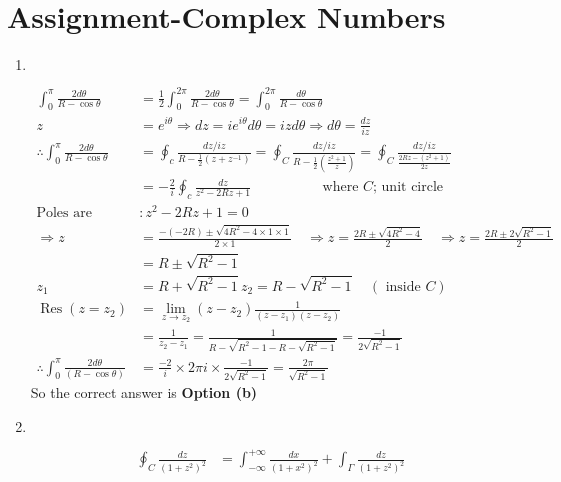 \chapter{Assignment-Complex Numbers}
\begin{enumerate}
	\item $\left. \right. $
	\begin{answer}
		\begin{align*}
		\int_{0}^{\pi} \frac{2 d \theta}{R-\cos \theta}&=\frac{1}{2} \int_{0}^{2 \pi} \frac{2 d \theta}{R-\cos \theta}=\int_{0}^{2 \pi} \frac{d \theta}{R-\cos \theta}\\
		z&=e^{i \theta} \Rightarrow d z=i e^{i \theta} d \theta=i z d \theta \Rightarrow d \theta=\frac{d z}{i z} \\
		\therefore \int_{0}^{\pi} \frac{2 d \theta}{R-\cos \theta}&=\oint_{c} \frac{d z / i z}{R-\frac{1}{2}\left(z+z^{-1}\right)}=\oint_{C} \frac{d z / i z}{R-\frac{1}{2}\left(\frac{z^{2}+1}{z}\right)}=\oint_{C} \frac{d z / i z}{\frac{2 R z-\left(z^{2}+1\right)}{2 z}}\\
		&=-\frac{2}{i} \oint_{c} \frac{d z}{z^{2}-2 R z+1}\hspace{2cm}
	\text{	where $C$; unit circle}\\
	\text{Poles are }&: z^{2}-2 R z+1=0\\
	\Rightarrow z&=\frac{-(-2 R) \pm \sqrt{4 R^{2}-4 \times 1 \times 1}}{2 \times 1} \quad \Rightarrow z=\frac{2 R \pm \sqrt{4 R^{2}-4}}{2} \quad \Rightarrow z=\frac{2 R \pm 2 \sqrt{R^{2}-1}}{2}\\
	&=R \pm \sqrt{R^{2}-1}\\
	z_{1}&=R+\sqrt{R^{2}-1} z_{2}=R-\sqrt{R^{2}-1} \quad(\text{ inside }C)\\
	\operatorname{Res}\left(z=z_{2}\right)&=\lim _{z \rightarrow z_{2}}\left(z-z_{2}\right) \frac{1}{\left(z-z_{1}\right)\left(z-z_{2}\right)}\\
	&=\frac{1}{z_{2}-z_{1}}=\frac{1}{R-\sqrt{R^{2}-1-R-\sqrt{R^{2}-1}}}=\frac{-1}{2 \sqrt{R^{2}-1}}\\
	\therefore \int_{0}^{\pi} \frac{2 d \theta}{(R-\cos \theta)}&=\frac{-2}{i} \times 2 \pi i \times \frac{-1}{2 \sqrt{R^{2}-1}}=\frac{2 \pi}{\sqrt{R^{2}-1}}
		\end{align*}
		So the correct answer is \textbf{Option (b)}
	\end{answer}
		\item $\left. \right. $
	\begin{answer}
		\begin{align*}
		\oint_{C} \frac{d z}{\left(1+z^{2}\right)^{2}}&=\int_{-\infty}^{+\infty} \frac{d x}{\left(1+x^{2}\right)^{2}}+\int_{\Gamma} \frac{d z}{\left(1+z^{2}\right)^{2}}\\

\end{align*}
\end{answer}
\end{enumerate}
